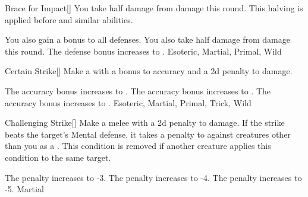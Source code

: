 \lowercase{\hypertarget{maneuver:Brace for Impact}{}}\label{maneuver:Brace for Impact}
\hypertarget{maneuver:Brace for Impact}{}
\begin{freeability}[Rank 1]{Brace for Impact}[]
You take half damage from  damage this round.
This halving is applied before  and similar abilities.

\rankline
{} You also gain a  bonus to all defenses.
 You also take half damage from  damage this round.
 The defense bonus increases to .
 Esoteric, Martial, Primal, Wild
\end{freeability}
\vspace{0.25em}



\lowercase{\hypertarget{maneuver:Certain Strike}{}}\label{maneuver:Certain Strike}
\hypertarget{maneuver:Certain Strike}{}
\begin{freeability}[Rank 1]{Certain Strike}[]
Make a  with a  bonus to accuracy and a \minus2d penalty to damage.

\rankline
{} The accuracy bonus increases to .
 The accuracy bonus increases to .
 The accuracy bonus increases to .
 Esoteric, Martial, Primal, Trick, Wild
\end{freeability}
\vspace{0.25em}



\lowercase{\hypertarget{maneuver:Challenging Strike}{}}\label{maneuver:Challenging Strike}
\hypertarget{maneuver:Challenging Strike}{}
\begin{freeability}[Rank 1]{Challenging Strike}[]
Make a melee  with a \minus2d penalty to damage.
If the strike beats the target's Mental defense, it takes a  penalty to  against creatures other than you as a .
This condition is removed if another creature applies this condition to the same target.

\rankline
{} The penalty increases to -3.
 The penalty increases to -4.
 The penalty increases to -5.
 Martial
\end{freeability}
\vspace{0.25em}



